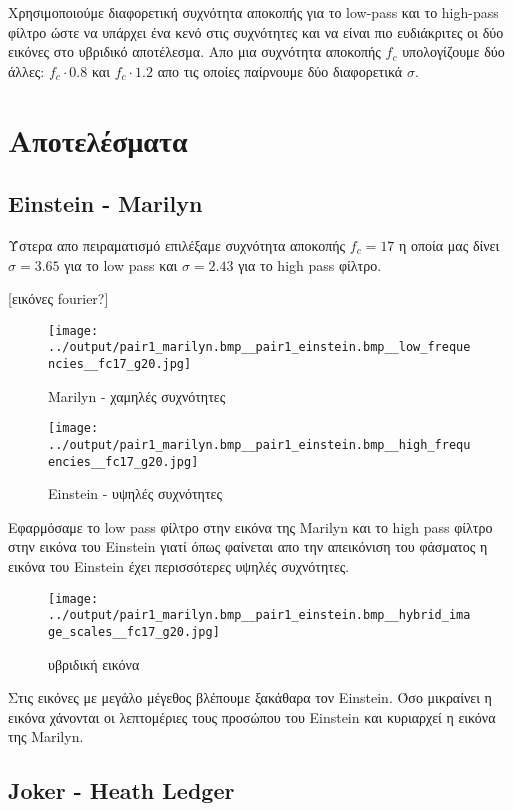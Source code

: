 \documentclass[11pt]{scrartcl} %
\begin{document}
Χρησιμοποιούμε διαφορετική συχνότητα αποκοπής για το low-pass και το high-pass φίλτρο ώστε να υπάρχει ένα κενό στις συχνότητες και να είναι πιο ευδιάκριτες οι δύο εικόνες στο υβριδικό αποτέλεσμα. Απο μια συχνότητα αποκοπής $f_c$ υπολογίζουμε δύο άλλες: $f_c \cdot 0.8$ και $f_c \cdot 1.2$ απο τις οποίες παίρνουμε δύο διαφορετικά $\sigma$.

\section{Αποτελέσματα}

\subsection{Einstein - Marilyn}

Ύστερα απο πειραματισμό επιλέξαμε συχνότητα αποκοπής $f_c = 17$ η οποία μας δίνει $\sigma = 3.65$ για το low pass και $\sigma = 2.43$ για το high pass φίλτρο.

[εικόνες fourier?]
\begin{figure}[H]
  \begin{minipage}[c]{9cm}
    \texttt{[image: ../output/pair1\_marilyn.bmp\_\_pair1\_einstein.bmp\_\_low\_frequencies\_\_fc17\_g20.jpg]}
    \caption{Marilyn - χαμηλές συχνότητες}
  \end{minipage}
  \begin{minipage}[c]{9cm}
    \texttt{[image: ../output/pair1\_marilyn.bmp\_\_pair1\_einstein.bmp\_\_high\_frequencies\_\_fc17\_g20.jpg]}
    \caption{Einstein - υψηλές συχνότητες}
  \end{minipage}
\end{figure}

Εφαρμόσαμε το low pass φίλτρο στην εικόνα της Marilyn και το high pass φίλτρο στην εικόνα του Einstein γιατί όπως φαίνεται απο την απεικόνιση του φάσματος η εικόνα του Einstein έχει περισσότερες υψηλές συχνότητες.

\begin{figure}[H]
  \texttt{[image: ../output/pair1\_marilyn.bmp\_\_pair1\_einstein.bmp\_\_hybrid\_image\_scales\_\_fc17\_g20.jpg]}
  \caption{υβριδική εικόνα}
\end{figure}

Στις εικόνες με μεγάλο μέγεθος βλέπουμε ξακάθαρα τον Einstein. Όσο μικραίνει η εικόνα χάνονται οι λεπτομέριες τους προσώπου του Einstein και κυριαρχεί η εικόνα της Marilyn.

\subsection{Joker - Heath Ledger}
\end{document}
